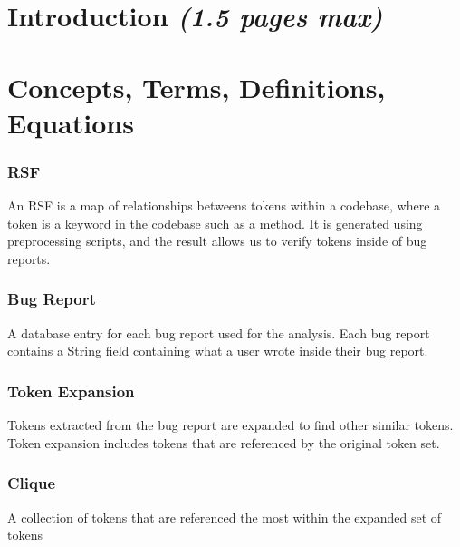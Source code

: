 \documentclass[12pt]{article}
\begin{document}
\hypertarget{introduction-1.5-pages-max}{%
\section{\texorpdfstring{Introduction \emph{(1.5 pages
max)}}{Introduction (1.5 pages max)}}\label{introduction-1.5-pages-max}}

\hypertarget{concepts-terms-definitions-equations}{%
\section{Concepts, Terms, Definitions,
Equations}\label{concepts-terms-definitions-equations}}

\hypertarget{rsf}{%
\subsubsection{RSF}\label{rsf}}

An RSF is a map of relationships betweens tokens within a codebase,
where a token is a keyword in the codebase such as a method. It is
generated using preprocessing scripts, and the result allows us to
verify tokens inside of bug reports.

\hypertarget{bug-report}{%
\subsubsection{Bug Report}\label{bug-report}}

A database entry for each bug report used for the analysis. Each bug
report contains a String field containing what a user wrote inside their
bug report.

\hypertarget{token-expansion}{%
\subsubsection{Token Expansion}\label{token-expansion}}

Tokens extracted from the bug report are expanded to find other similar
tokens. Token expansion includes tokens that are referenced by the
original token set.

\hypertarget{clique}{%
\subsubsection{Clique}\label{clique}}

A collection of tokens that are referenced the most within the expanded
set of tokens
\end{document}
